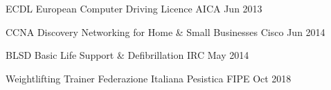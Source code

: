 

\begin{cvhonors}

	\cvhonor
	{ECDL}
	{European Computer Driving Licence}
	{AICA}
	{Jun 2013}
	
	\cvhonor
	{CCNA Discovery}
	{Networking for Home \& Small Businesses}
	{Cisco}
	{Jun 2014}
	
	\cvhonor
	{BLSD}
	{Basic Life Support \& Defibrillation}
	{IRC}
	{May 2014}

	\cvhonor
	{Weightlifting Trainer}
	{Federazione Italiana Pesistica}
	{FIPE}
	{Oct 2018}
	
\end{cvhonors}
